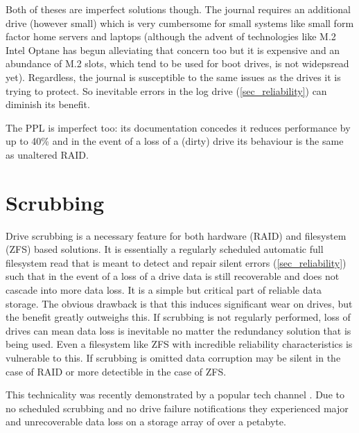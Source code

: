         Both of theses are imperfect solutions though. The journal requires an
        additional drive (however small) which is very cumbersome for small
        systems like small form factor home servers and laptops (although the
        advent of technologies like M.2 Intel Optane \cite{Optane_homepage} has
        begun alleviating that concern too but it is expensive and an abundance
        of M.2 slots, which tend to be used for boot drives, is not widepsread
        yet). Regardless, the journal is susceptible to the same issues as the
        drives it is trying to protect.  So inevitable errors in the log drive
        (\ref{sec_reliability}) can diminish its benefit.

        The PPL is imperfect too: its documentation \cite{PPL} concedes it
        reduces performance by up to 40\% and in the event of a loss of a
        (dirty) drive its behaviour is the same as unaltered RAID.

    \section{Scrubbing}

        Drive scrubbing is a necessary feature for both hardware (RAID) and
        filesystem (ZFS) based solutions. It is essentially a regularly
        scheduled automatic full filesystem read that is meant to detect and
        repair silent errors (\ref{sec_reliability}) such that in the event of
        a loss of a drive data is still recoverable and does not cascade into
        more data loss. It is a simple but critical part of reliable data
        storage. The obvious drawback is that this induces significant wear on
        drives, but the benefit greatly outweighs this. If scrubbing is not
        regularly performed, loss of drives can mean data loss is inevitable no
        matter the redundancy solution that is being used. Even a filesystem
        like ZFS with incredible reliability characteristics
        \cite{ZFS_reliability} is vulnerable to this. If scrubbing is omitted
        data corruption may be silent in the case of RAID or more detectible in
        the case of ZFS.

        This technicality was recently demonstrated by a popular tech channel
        \cite{LTT_data_loss}. Due to no scheduled scrubbing and no drive
        failure notifications they experienced major and unrecoverable data
        loss on a storage array of over a petabyte.


